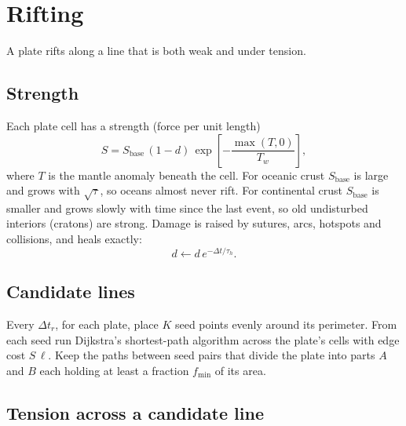 \documentclass[11pt,a4paper]{article}
\begin{document}
\section{Rifting}\label{sec:rift}

A plate rifts along a line that is both weak and under tension.

\subsection{Strength}

Each plate cell has a strength (force per unit length)
\begin{equation}
S = S_\mathrm{base}\,(1 - d)\,\exp\!\left[-\frac{\max(T, 0)}{T_w}\right],
\end{equation}
where $T$ is the mantle anomaly beneath the cell. For oceanic crust
$S_\mathrm{base}$ is large and grows with $\sqrt{\tau}$, so oceans almost
never rift. For continental crust $S_\mathrm{base}$ is smaller and grows
slowly with time since the last event, so old undisturbed interiors (cratons)
are strong. Damage is raised by sutures, arcs, hotspots and collisions, and
heals exactly:
\begin{equation}
d \leftarrow d\,e^{-\Delta t/\tau_h}.
\end{equation}

\subsection{Candidate lines}

Every $\Delta t_r$, for each plate, place $K$ seed points evenly around its
perimeter. From each seed run Dijkstra's shortest-path algorithm across the
plate's cells with edge cost $S\,\ell$. Keep the paths between seed pairs
that divide the plate into parts $A$ and $B$ each holding at least a fraction
$f_\mathrm{min}$ of its area.

\subsection{Tension across a candidate line}
\end{document}
